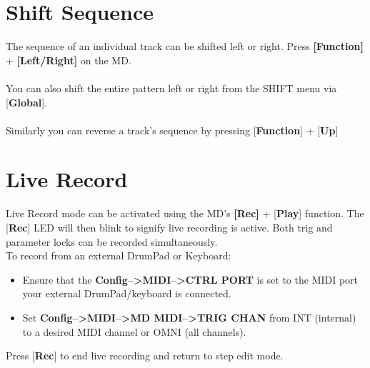\section{Shift Sequence}
The sequence of an individual track can be shifted left or right. Press \textbf{[Function]} + \textbf{[Left/Right]} on the MD. \\\\You can also shift the entire pattern left or right from the SHIFT menu via [\textbf{Global}].\\\\
Similarly you can reverse a track's sequence by pressing [\textbf{Function}] + [\textbf{Up}]
\section{Live Record}
Live Record mode can be activated using the MD's \textbf{[Rec]} + [\textbf{Play}] function.  The [\textbf{Rec}] LED will then blink to signify live recording is active. Both trig and parameter locks can be recorded simultaneously.\\
To record from an external DrumPad or Keyboard:
\begin{itemize}
    \item Ensure that the \textbf{Config-->MIDI-->CTRL PORT} is set to the MIDI port your external DrumPad/keyboard is connected.
    \item Set \textbf{Config-->MIDI-->MD MIDI-->TRIG CHAN} from INT (internal) to a desired MIDI channel or OMNI (all channels).
\end{itemize}
Press [\textbf{Rec}] to end live recording and return to step edit mode.

\newpage